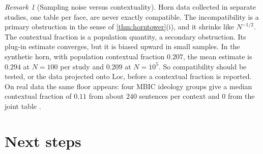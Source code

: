 \documentclass[11pt]{article}
\theoremstyle{definition}
\theoremstyle{remark}
\newtheorem{remark}[theorem]{Remark}
\begin{document}
\begin{remark}[Sampling noise versus contextuality]
Horn data collected in separate studies, one table per face, are never exactly compatible. The incompatibility is a
primary obstruction in the sense of \cref{thm:horntower}(i), and it shrinks like $N^{-1/2}$. The contextual fraction is a
population quantity, a secondary obstruction. Its plug-in estimate converges, but it is biased upward in small samples.
In the synthetic horn, with population contextual fraction $0.207$, the mean estimate is $0.294$ at $N=100$ per study and
$0.209$ at $N=10^5$. So compatibility should be tested, or the data projected onto $\mathrm{Loc}$, before a contextual
fraction is reported. On real data the same floor appears: four MBIC ideology groups give a median contextual fraction of
$0.11$ from about $240$ sentences per context and $0$ from the joint table \cite[\S38.8]{Awasthi-ThreeLayers}.
\end{remark}

\section{Next steps}\label{sec:next}
\end{document}
